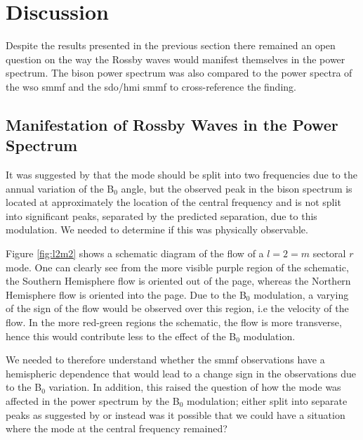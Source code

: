 \section{Discussion}\label{sec:r-mode_discussion}


Despite the results presented in the previous section there remained an open question on the way the Rossby waves would manifest themselves in the power spectrum. The \gls{bison} power spectrum was also compared to the power spectra of the \gls{wso} \gls{smmf} and the \gls{sdo/hmi} \gls{smmf} to cross-reference the finding.

\subsection{Manifestation of Rossby Waves in the Power Spectrum}

It was suggested by \citet{lanza_sectoral_2019} that the mode should be split into two frequencies due to the annual variation of the B$_0$ angle, but the observed peak in the \gls{bison} spectrum is located at approximately the location of the central frequency and is not split into significant peaks, separated by the predicted separation, due to this modulation. We needed to determine if this was physically observable.

Figure \ref{fig:l2m2} shows a schematic diagram of the flow of a $l=2=m$ sectoral $r$ mode. One can clearly see from the more visible purple region of the schematic, the Southern Hemisphere flow is oriented out of the page, whereas the Northern Hemisphere flow is oriented into the page. Due to the B$_0$ modulation, a varying of the sign of the flow would be observed over this region, i.e the velocity of the flow. In the more red-green regions the schematic, the flow is more transverse, hence this would contribute less to the effect of the B$_0$ modulation.

We needed to therefore understand whether the \gls{smmf} observations have a hemispheric dependence that would lead to a change sign in the observations due to the B$_0$ variation. In addition, this raised the question of how the mode was affected in the power spectrum by the B$_0$ modulation; either split into separate peaks as suggested by \citet{lanza_sectoral_2019} or instead was it possible that we could have a situation where the mode at the central frequency remained?

